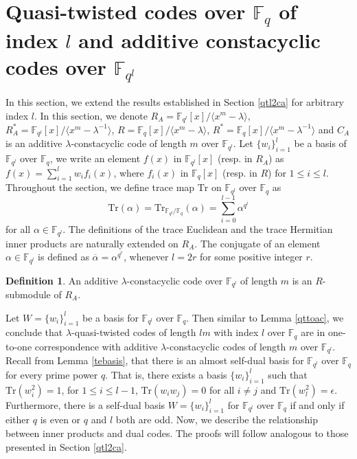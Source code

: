 \documentclass[12 pt]{extarticle}
\numberwithin{equation}{section}
\theoremstyle{definition}
\newtheorem{definition}{Definition}[section]
\begin{document}
\section{Quasi-twisted codes over $\mathbb{F}_q$ of index $l$ and additive constacyclic codes over $\mathbb{F}_{q^l}$}\label{qttoconstal}
In this section, we extend the results established in Section \ref{qtl2ca} for arbitrary index $l$. In this section, we denote $R_A=\mathbb{F}_{q^l}[x]/\langle x^m-\lambda \rangle$, $R_A^*=\mathbb{F}_{q^l}[x]/\langle x^m-\lambda^{-1} \rangle$, $R=\mathbb{F}_q[x]/\langle x^m-\lambda \rangle$, $R^*=\mathbb{F}_q[x]/\langle x^m-\lambda^{-1} \rangle$ and $C_A$ is an additive $\lambda$-constacyclic code of length $m$ over $\mathbb{F}_{q^l}$. Let $\{w_i\}_{i=1}^l$ be a basis of $\mathbb{F}_{q^l}$ over $\mathbb{F}_q$, we write an element $f(x)$ in $\mathbb{F}_{q^l}[x]$  (resp. in $R_A$) as $f(x)=\sum_{i=1}^lw_if_i(x)$, where $f_i(x)$ in $\mathbb{F}_q[x]$ (resp. in $R$) for $1\leq i\leq l$. Throughout the section, we define trace map $\text{Tr}$ on $\mathbb{F}_{q^l}$ over $\mathbb{F}_q$ as $$\text{Tr}(\alpha)=\text{Tr}_{\mathbb{F}_{q^l}/\mathbb{F}_q}(\alpha)=\sum_{i=0}^{l-1} \alpha^{q^i}$$ for all $\alpha\in \mathbb{F}_{q^l}$. The definitions of the trace Euclidean and the trace Hermitian inner products are naturally extended on $R_A$. The conjugate of an element $\alpha\in \mathbb{F}_{q^l}$ is defined as $\overline{\alpha}=\alpha^{q^r}$, whenever $l=2r$ for some positive integer $r$.
\begin{definition}
    An additive $\lambda$-constacyclic code  over $\mathbb{F}_{q^l}$ of length $m$ is an $R$-submodule of $R_A$.
\end{definition}
Let $W=\{w_i\}_{i=1}^l$ be a basis for $\mathbb{F}_{q^l}$ over $\mathbb{F}_q$. Then similar to Lemma \ref{qttoac}, we conclude that  $\lambda$-quasi-twisted codes of length $lm$ with index $l$ over $\mathbb{F}_q$ are in one-to-one correspondence with additive $\lambda$-constacyclic codes of length $m$ over $\mathbb{F}_{q^l}$. Recall from Lemma \ref{tebasis}, that there is an almost self-dual basis for $\mathbb{F}_{q^l}$ over $\mathbb{F}_q$ for every prime power $q$. That is, there exists a basis $\{w_i\}_{i=1}^l$ such that $\text{Tr}(w_i^2)=1$, for $1\leq i\leq l-1$, $\text{Tr}(w_iw_j)=0$ for all $i\neq j$ and $\text{Tr}(w_l^2)=\epsilon$. Furthermore, there is a self-dual basis $W=\{w_i\}_{i=1}^l$ for $\mathbb{F}_{q^l}$ over $\mathbb{F}_q$ if and only if either $q$ is even or $q$ and $l$ both are odd. Now, we describe the relationship between inner products and dual codes. The proofs will follow analogous to those presented in Section \ref{qtl2ca}.
\end{document}
